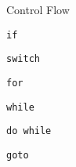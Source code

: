 \begin{frame}{}
  \centerline{\LARGE Control Flow}
\end{frame}

\begin{frame}{\texttt{if}}
  
\end{frame}

\begin{frame}[fragile]{\texttt{switch}}
\end{frame}

\begin{frame}[fragile]{\texttt{for}}
\end{frame}

\begin{frame}[fragile]{\texttt{while}}
\end{frame}

\begin{frame}[fragile]{\texttt{do while}}
\end{frame}

\begin{frame}[fragile]{\texttt{goto}}
\end{frame}
